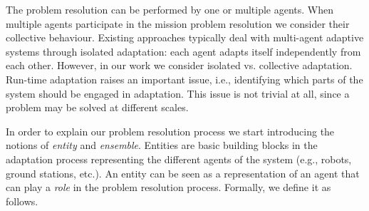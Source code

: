 \documentclass[journal]{IEEEtran}
\theoremstyle{definition}
\begin{document}
The problem resolution can be performed by one or multiple agents. When multiple agents participate in the mission problem resolution we  consider their collective behaviour.
Existing approaches typically deal with
multi-agent adaptive systems through isolated adaptation: each agent adapts itself independently from each
other. However, in our work we consider isolated vs. collective adaptation.
Run-time adaptation raises an important issue, i.e., identifying
which parts of the system should be engaged in adaptation.
This issue is not trivial at all, since a problem may be solved at different scales.

In order to explain our problem resolution process we
start introducing the notions of \textit{entity} and \textit{ensemble}.
Entities are basic building blocks in the adaptation process representing the different agents of the system (e.g., robots, ground stations, etc.).
An entity can be seen as a representation of an agent that can play a \textit{role} in the problem resolution process. 
Formally, we define it as follows.
\end{document}
